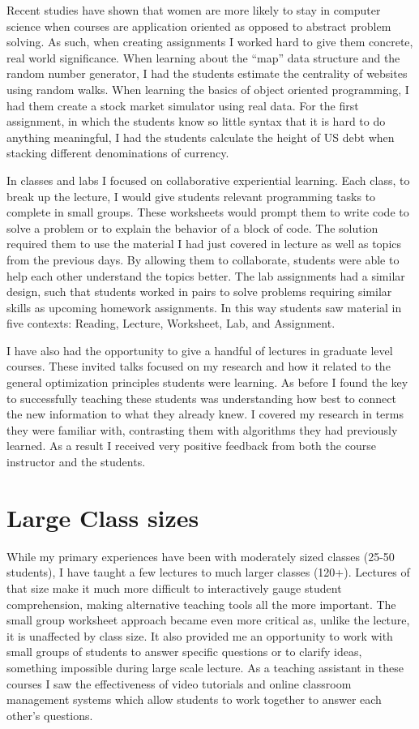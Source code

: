 \documentclass[a4paper, 11pt]{article}
\begin{document}
Recent studies have shown that women are more likely to stay
in computer science when courses are application oriented
as opposed to abstract problem solving. As such, when creating
assignments I worked hard to give them concrete,
real world significance. When learning about the ``map'' data
structure and the random number generator, I had the students
estimate the centrality of websites using random walks.
When learning the basics of object oriented programming,
I had them create a stock market simulator using real data.
For the first assignment, in which the students know so little
syntax that it is hard to do anything meaningful, I had the
students calculate the height of US debt when stacking different denominations of currency.

In classes and labs I focused on collaborative experiential learning.
Each class, to break up the lecture, I would give students
relevant programming tasks to complete in small groups.
These worksheets would prompt them to write code to solve a
problem or to explain the behavior of a block of code. The solution
required them to use the material I had just covered in lecture as
well as topics from the previous days. By allowing them to collaborate,
students were able to help each other understand the topics better.
The lab assignments had a similar design, such that students worked
in pairs to solve problems requiring similar skills as upcoming
homework assignments. In this way students saw material in five
contexts: Reading, Lecture, Worksheet, Lab, and Assignment.

I have also had the opportunity to give a handful of lectures in graduate level courses.
These invited talks focused on my research and how it related
to the general optimization principles students were learning.
As before I found the key to successfully teaching these students
was understanding how best to connect the new information to
what they already knew. I covered my research in terms they
were familiar with, contrasting them with algorithms they had
previously learned. As a result I received very positive
feedback from both the course instructor and the students.

\section{Large Class sizes}
While my primary experiences have been with moderately sized
classes (25-50 students), I have taught a few lectures to much
larger classes (120+). Lectures of that size make it much more
difficult to interactively gauge student comprehension, making
alternative teaching tools all the more important. The small
group worksheet approach became even more critical as, unlike
the lecture, it is unaffected by class size. It also provided
me an opportunity to work with small groups of students to
answer specific questions or to clarify ideas, something impossible
during large scale lecture. As a teaching assistant in these
courses I saw the effectiveness of video tutorials and online
classroom management systems which allow students to work together to answer each other’s questions.
\end{document}
